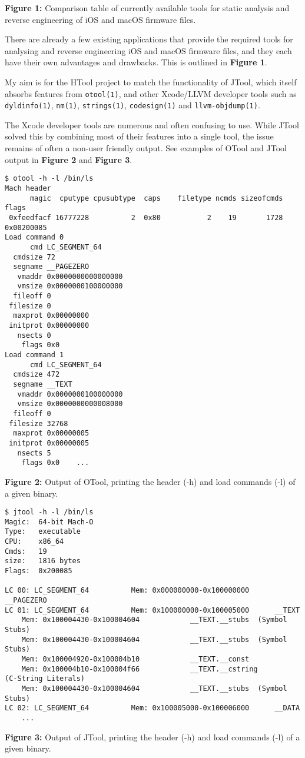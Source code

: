 \begin{center}
	\caption{\textbf{Figure 1:} Comparison table of currently available tools for static analysis and reverse engineering of iOS and macOS firmware files.}
\end{center}

There are already a few existing applications that provide the required tools for analysing and reverse engineering iOS and macOS firmware files, and they each have their own advantages and drawbacks. This is outlined in \textbf{Figure 1}.

My aim is for the HTool project to match the functionality of JTool, which itself absorbs features from \texttt{otool(1)}, and other Xcode/LLVM developer tools such as \texttt{dyldinfo(1)}, \texttt{nm(1)}, \texttt{strings(1)}, \texttt{codesign(1)} and \texttt{llvm-objdump(1)}. 

The Xcode developer tools are numerous and often confusing to use. While JTool solved this by combining most of their features into a single tool, the issue remains of often a non-user friendly output. See examples of OTool and JTool output in \textbf{Figure 2} and \textbf{Figure 3}.

\begin{verbatim}
$ otool -h -l /bin/ls
Mach header
      magic  cputype cpusubtype  caps    filetype ncmds sizeofcmds      flags
 0xfeedfacf 16777228          2  0x80           2    19       1728 0x00200085
Load command 0
      cmd LC_SEGMENT_64
  cmdsize 72
  segname __PAGEZERO
   vmaddr 0x0000000000000000
   vmsize 0x0000000100000000
  fileoff 0
 filesize 0
  maxprot 0x00000000
 initprot 0x00000000
   nsects 0
    flags 0x0
Load command 1
      cmd LC_SEGMENT_64
  cmdsize 472
  segname __TEXT
   vmaddr 0x0000000100000000
   vmsize 0x0000000000008000
  fileoff 0
 filesize 32768
  maxprot 0x00000005
 initprot 0x00000005
   nsects 5
    flags 0x0    ...
\end{verbatim}
\begin{center}
	\caption{\textbf{Figure 2:} Output of OTool, printing the header (-h) and load commands (-l) of a given binary.}
\end{center}

\begin{verbatim}
$ jtool -h -l /bin/ls
Magic:	64-bit Mach-O
Type:	executable
CPU:	x86_64
Cmds:	19
size:	1816 bytes
Flags:	0x200085

LC 00: LC_SEGMENT_64          Mem: 0x000000000-0x100000000      __PAGEZERO
LC 01: LC_SEGMENT_64          Mem: 0x100000000-0x100005000      __TEXT
	Mem: 0x100004430-0x100004604            __TEXT.__stubs  (Symbol Stubs)
	Mem: 0x100004430-0x100004604            __TEXT.__stubs  (Symbol Stubs)
	Mem: 0x100004920-0x100004b10            __TEXT.__const  
	Mem: 0x100004b10-0x100004f66            __TEXT.__cstring        (C-String Literals)               
	Mem: 0x100004430-0x100004604            __TEXT.__stubs  (Symbol Stubs)
LC 02: LC_SEGMENT_64          Mem: 0x100005000-0x100006000      __DATA
    ...
\end{verbatim}
\begin{center}
	\caption{\textbf{Figure 3:} Output of JTool, printing the header (-h) and load commands (-l) of a given binary.}
\end{center}


